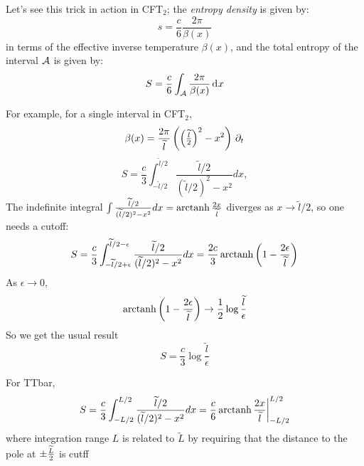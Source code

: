 \documentclass[11pt,a4paper,utf8]{article}
\renewcommand{\tilde}[1]{\ensuremath{\widetilde{#1}}}
\begin{document}
	Let's see this trick in action in CFT$_2$; the \textit{entropy density} is given by:
	\begin{equation}
	s = \frac{c}{6} \frac{2\pi}{\beta(x)}
	\end{equation}
	in terms of the effective inverse temperature $\beta(x)$, and the total entropy of the interval $\mathcal{A}$ is given by:
	\begin{equation}
	S = \frac{c}{6}
		\int_{\mathcal{A}} \frac{2\pi}{\beta(x)} \mathinner{\mathrm{d}^{}x}
	\end{equation}
	
	For example, for a single interval in CFT$_2$,
	\begin{equation}
		\beta(x)
		= \frac{2\pi}{\tilde{l}}
			\pqty{
				\pqty{\tfrac{\tilde{l}}{2}}^2
				- x^2
			} \,\pdd{t}
	\end{equation}
	\begin{equation}
	S= \frac{c}{3} \int_{-\tilde{l}/2}^{\tilde{l}/2}
			\frac{\tilde{l}/2}{(\tilde{l}/2)^2-x^2}dx,
	\end{equation}
	The indefinite integral $
		\int \frac{\tilde{l}/2}{(\tilde{l}/2)^2-x^2}dx
		= \mop{arctanh}\frac{2x}{\tilde{l}}
	$ diverges as $x\rightarrow \tilde{l}/2$, so one needs a cutoff:
	\begin{equation}
	S=\frac{c}{3}\int_{-\tilde{l}/2+\epsilon}^{\tilde{l}/2-\epsilon}
		\frac{\tilde{l}/2}{(\tilde{l}/2)^2-x^2}dx
	=\frac{2c}{3} \mop{arctanh} \pqty{
			1-\frac{2\epsilon}{\tilde{l}}
		}
	\end{equation}
	As $\epsilon\rightarrow 0$,
	\begin{equation}
		\mop{arctanh} \pqty{
			1-\frac{2\epsilon}{\tilde{l}}
		}\rightarrow \frac{1}{2}\log\frac{\tilde{l}}{\epsilon}
	\end{equation}
	So we get the usual result
	\begin{equation}
	S=\frac{c}{3}\log\frac{\tilde{l}}{\epsilon}
	\end{equation}
	
	{\color{red} For TTbar,  \begin{equation}
	S=\frac{c}{3}\int_{- L/2}^{L/2}
		\frac{\tilde{l}/2}{(\tilde{l}/2)^2-x^2}dx
		={c\over6} \mop{arctanh} {2x\over \tilde{l}}\bigg|^{L/2}_{-{L/2}}
	\end{equation}   }
	where integration range $L$ is related to $\tilde L$ by requiring that the distance to the pole at $\pm{\tilde L\over 2}$ is cutff
	\eq{
({\tilde L\over 2})^2=2\lambda+({ L\over 2})^2}
	
	
	
\end{document}

